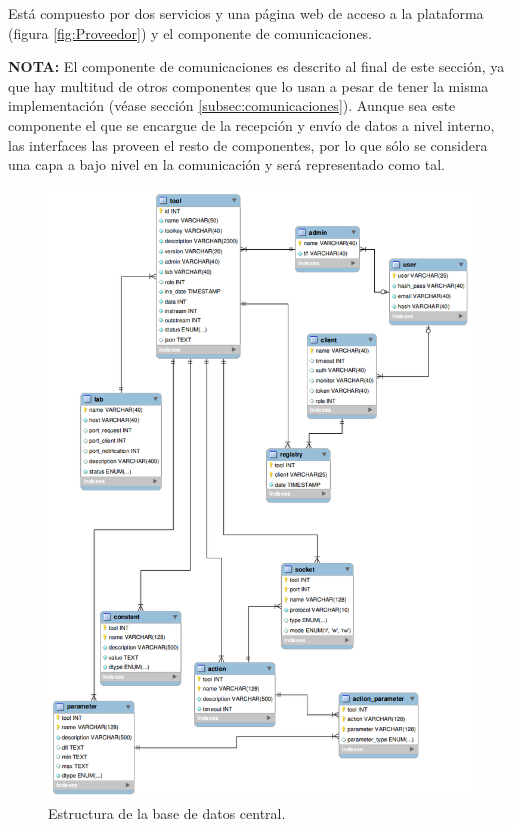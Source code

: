 Está compuesto por dos servicios y una página web de acceso a la 
plataforma (figura \ref{fig:Proveedor}) y el componente de 
comunicaciones.

\textbf{NOTA:} El componente de comunicaciones es descrito al final de 
este sección, ya que hay multitud de otros componentes que lo usan a 
pesar de tener la misma implementación (véase sección 
\ref{subsec:comunicaciones}). Aunque sea este componente el que se 
encargue de la recepción y envío de datos a nivel interno, las 
interfaces las proveen el resto de componentes, por lo que sólo se 
considera una capa a bajo nivel en la comunicación y será 
representado como tal.

\begin{figure}[H]
	\centering
	\includegraphics[scale=0.55]{images/erproveedor.png}
	\caption[E-R central]{Estructura de la base de datos central.}
	\label{fig:erproveedor}
\end{figure}

